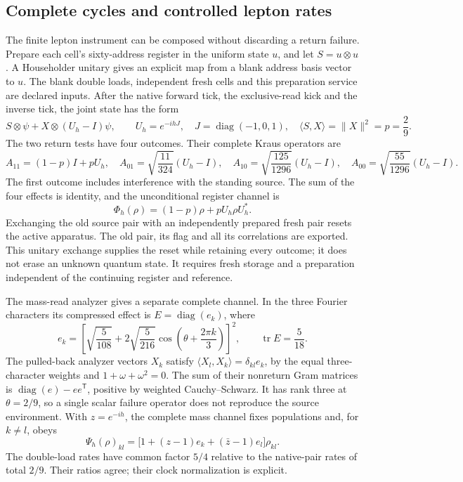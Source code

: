 \subsection{Complete cycles and controlled lepton rates}
\label{sec:complete-lepton-cycles}

The finite lepton instrument can be composed without discarding a return failure.
Prepare each cell's sixty-address register in the uniform state $u$, and let
$S=u\otimes u$. A Householder unitary gives an explicit map from a blank address
basis vector to $u$. The blank double loads, independent fresh cells and this
preparation service are declared inputs. After the native forward tick, the
exclusive-read kick and the inverse tick, the joint state has the form
\[
 S\otimes\psi+X\otimes(U_h-I)\psi,
 \qquad U_h=e^{-ihJ},\quad J=\operatorname{diag}(-1,0,1),
 \quad \langle S,X\rangle=\|X\|^2=p=\frac29.
\]
The two return tests have four outcomes. Their complete Kraus operators are
\[
 A_{11}=(1-p)I+pU_h,\quad
 A_{01}=\sqrt{\frac{11}{324}}(U_h-I),\quad
 A_{10}=\sqrt{\frac{125}{1296}}(U_h-I),\quad
 A_{00}=\sqrt{\frac{55}{1296}}(U_h-I).
\]
The first outcome includes interference with the standing source. The sum of
the four effects is identity, and the unconditional register channel is
\[
 \Phi_h(\rho)=(1-p)\rho+pU_h\rho U_h^*.
\]
Exchanging the old source pair with an independently prepared fresh pair resets
the active apparatus. The old pair, its flag and all its correlations are
exported. This unitary exchange supplies the reset while retaining every
outcome; it does not erase an unknown quantum state. It requires fresh storage
and a preparation independent of the continuing register and reference.

The mass-read analyzer gives a separate complete channel. In the three Fourier
characters its compressed effect is $E=\operatorname{diag}(e_k)$, where
\[
 e_k=\left[\sqrt{\frac5{108}}+
       2\sqrt{\frac5{216}}\cos\left(\theta+\frac{2\pi k}{3}\right)\right]^2,
 \qquad \operatorname{tr}E=\frac5{18}.
\]
The pulled-back analyzer vectors $X_k$ satisfy
$\langle X_l,X_k\rangle=\delta_{kl}e_k$, by the equal three-character weights
and $1+\omega+\omega^2=0$. The sum of their nonreturn Gram matrices is
$\operatorname{diag}(e)-ee^{\mathsf T}$, positive by weighted Cauchy--Schwarz.
It has rank three at $\theta=2/9$, so a single scalar failure operator does
not reproduce the source environment. With $z=e^{-ih}$, the complete mass
channel fixes populations and, for $k\ne l$, obeys
\[
 \Psi_h(\rho)_{kl}
   =\bigl[1+(z-1)e_k+(\bar z-1)e_l\bigr]\rho_{kl}.
\]
The double-load rates have common factor $5/4$ relative to the native-pair
rates of total $2/9$. Their ratios agree; their clock normalization is explicit.

